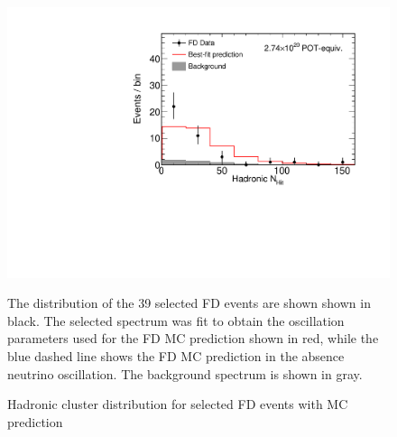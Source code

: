 \begin{figure}
\begin{center}
\includegraphics[width=\textwidth]{figures/results/fd_data_mc_numi_plots/hadNhit_unblind.pdf}
\end{center}
\caption{ Hadronic cluster \nhit distribution for selected FD events with MC prediction }{
The distribution of the 39 selected FD events are shown shown in black.
The selected spectrum was fit to obtain the oscillation parameters used
for the FD MC prediction shown in red, while
the blue dashed line shows the FD MC prediction in the absence neutrino
oscillation.
The background spectrum is shown in gray.
}
\label{hadNhit_unblind}

\end{figure}


